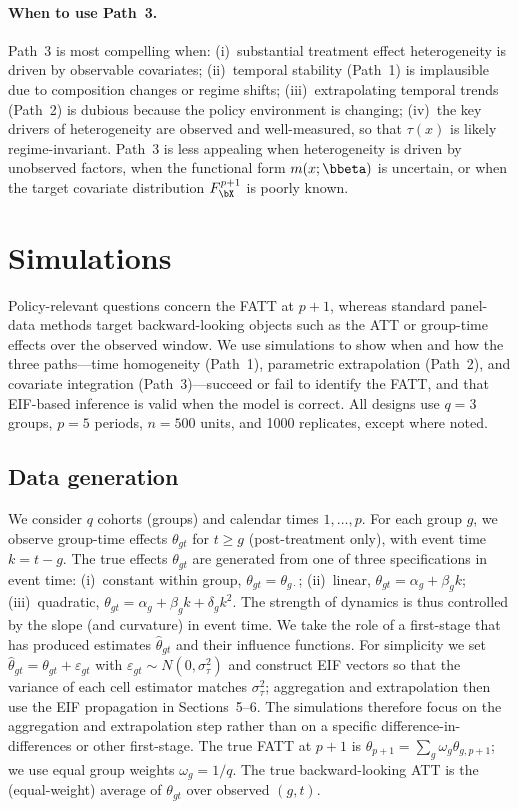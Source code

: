 \documentclass{article}
\begin{document}
\paragraph{When to use Path~3.} Path~3 is most compelling when: (i)~substantial treatment effect heterogeneity is driven by observable covariates; (ii)~temporal stability (Path~1) is implausible due to composition changes or regime shifts; (iii)~extrapolating temporal trends (Path~2) is dubious because the policy environment is changing; (iv)~the key drivers of heterogeneity are observed and well-measured, so that $\tau(x)$ is likely regime-invariant. Path~3 is less appealing when heterogeneity is driven by unobserved factors, when the functional form $m(x;\bbeta)$ is uncertain, or when the target covariate distribution $F_{\bX}^{p+1}$ is poorly known.

\section{Simulations}

Policy-relevant questions concern the FATT at $p+1$, whereas standard panel-data methods target backward-looking objects such as the ATT or group-time effects over the observed window. We use simulations to show when and how the three paths---time homogeneity (Path~1), parametric extrapolation (Path~2), and covariate integration (Path~3)---succeed or fail to identify the FATT, and that EIF-based inference is valid when the model is correct. All designs use $q=3$ groups, $p=5$ periods, $n=500$ units, and 1000 replicates, except where noted.

\subsection{Data generation}

We consider $q$ cohorts (groups) and calendar times $1,\ldots,p$. For each group $g$, we observe group-time effects $\theta_{gt}$ for $t \ge g$ (post-treatment only), with event time $k = t - g$. The true effects $\theta_{gt}$ are generated from one of three specifications in event time: (i)~constant within group, $\theta_{gt} = \theta_{g\cdot}$; (ii)~linear, $\theta_{gt} = \alpha_g + \beta_g k$; (iii)~quadratic, $\theta_{gt} = \alpha_g + \beta_g k + \delta_g k^2$. The strength of dynamics is thus controlled by the slope (and curvature) in event time. We take the role of a first-stage that has produced estimates $\widehat{\theta}_{gt}$ and their influence functions. For simplicity we set $\widehat{\theta}_{gt} = \theta_{gt} + \varepsilon_{gt}$ with $\varepsilon_{gt} \sim N(0,\sigma_\tau^2)$ and construct EIF vectors so that the variance of each cell estimator matches $\sigma_\tau^2$; aggregation and extrapolation then use the EIF propagation in Sections~5--6. The simulations therefore focus on the aggregation and extrapolation step rather than on a specific difference-in-differences or other first-stage. The true FATT at $p+1$ is $\theta_{p+1} = \sum_g \omega_g \theta_{g,p+1}$; we use equal group weights $\omega_g = 1/q$. The true backward-looking ATT is the (equal-weight) average of $\theta_{gt}$ over observed $(g,t)$.
\end{document}
